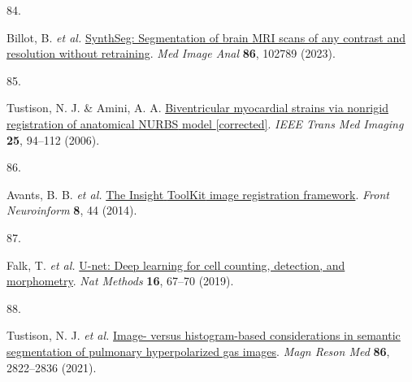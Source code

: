 \documentclass[
  12pt,
]{article}
\newlength{\cslhangindent}
\newlength{\csllabelwidth}
\newenvironment{CSLReferences}[2] %
 {\begin{list}{}{%
  \setlength{\itemindent}{0pt}
  \setlength{\leftmargin}{0pt}
  \setlength{\parsep}{0pt}
  \ifodd #1
   \setlength{\leftmargin}{\cslhangindent}
   \setlength{\itemindent}{-1\cslhangindent}
  \fi
  \setlength{\itemsep}{#2\baselineskip}}}
 {\end{list}}
\newcommand{\CSLLeftMargin}[1]{\parbox[t]{\csllabelwidth}{\strut#1\strut}}
\newcommand{\CSLRightInline}[1]{\parbox[t]{\linewidth - \csllabelwidth}{\strut#1\strut}}
\begin{document}
\begin{CSLReferences}{0}{0}
\CSLLeftMargin{84. }%
\CSLRightInline{Billot, B. \emph{et al.}
\href{https://doi.org/10.1016/j.media.2023.102789}{SynthSeg:
Segmentation of brain MRI scans of any contrast and resolution without
retraining}. \emph{Med Image Anal} \textbf{86}, 102789 (2023).}

\CSLLeftMargin{85. }%
\CSLRightInline{Tustison, N. J. \& Amini, A. A.
\href{https://doi.org/10.1109/TMI.2005.861015}{Biventricular myocardial
strains via nonrigid registration of anatomical {NURBS} model
{[}corrected{]}}. \emph{IEEE Trans Med Imaging} \textbf{25}, 94--112
(2006).}

\CSLLeftMargin{86. }%
\CSLRightInline{Avants, B. B. \emph{et al.}
\href{https://doi.org/10.3389/fninf.2014.00044}{The {Insight} {ToolKit}
image registration framework}. \emph{Front Neuroinform} \textbf{8}, 44
(2014).}

\CSLLeftMargin{87. }%
\CSLRightInline{Falk, T. \emph{et al.}
\href{https://doi.org/10.1038/s41592-018-0261-2}{U-net: Deep learning
for cell counting, detection, and morphometry}. \emph{Nat Methods}
\textbf{16}, 67--70 (2019).}

\CSLLeftMargin{88. }%
\CSLRightInline{Tustison, N. J. \emph{et al.}
\href{https://doi.org/10.1002/mrm.28908}{Image- versus histogram-based
considerations in semantic segmentation of pulmonary hyperpolarized gas
images}. \emph{Magn Reson Med} \textbf{86}, 2822--2836 (2021).}

\end{CSLReferences}
\end{document}
